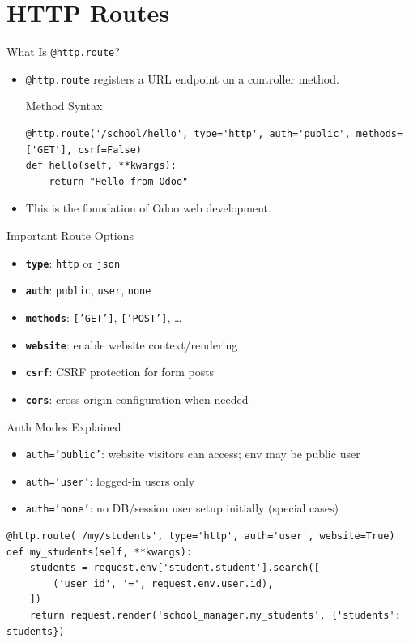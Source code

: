 \section{HTTP Routes}

\begin{frame}[fragile]{What Is \texttt{@http.route}?}
	\begin{itemize}
		\item \texttt{@http.route} registers a URL endpoint on a controller method.
\begin{block}{Method Syntax}
\begin{lstlisting}
@http.route('/school/hello', type='http', auth='public', methods=['GET'], csrf=False)
def hello(self, **kwargs):
	return "Hello from Odoo"
\end{lstlisting}
\end{block}
		\item This is the foundation of Odoo web development.
	\end{itemize}
\end{frame}

\begin{frame}[fragile]{Important Route Options}
	\begin{itemize}
		\item \textbf{\texttt{type}}: \texttt{http} or \texttt{json}
		\item \textbf{\texttt{auth}}: \texttt{public}, \texttt{user}, \texttt{none}
		\item \textbf{\texttt{methods}}: \texttt{['GET']}, \texttt{['POST']}, \ldots
		\item \textbf{\texttt{website}}: enable website context/rendering
		\item \textbf{\texttt{csrf}}: CSRF protection for form posts
		\item \textbf{\texttt{cors}}: cross-origin configuration when needed
	\end{itemize}
\end{frame}

\begin{frame}[fragile]{Auth Modes Explained}
	\begin{itemize}
		\item \texttt{auth='public'}: website visitors can access; env may be public user
		\item \texttt{auth='user'}: logged-in users only
		\item \texttt{auth='none'}: no DB/session user setup initially (special cases)
	\end{itemize}
\begin{lstlisting}
@http.route('/my/students', type='http', auth='user', website=True)
def my_students(self, **kwargs):
	students = request.env['student.student'].search([
		('user_id', '=', request.env.user.id),
	])
	return request.render('school_manager.my_students', {'students': students})
\end{lstlisting}
\end{frame}

